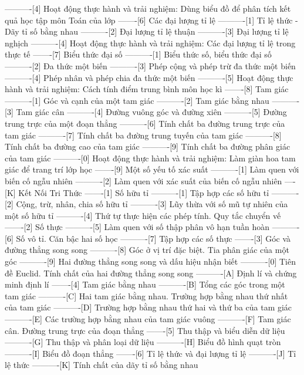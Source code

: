 ----------[4] Hoạt động thực hành và trải nghiệm: Dùng biểu đồ để phân tích kết quả học tập môn Toán của lớp
-------[6] Các đại lượng tỉ lệ
----------[1] Tỉ lệ thức - Dãy tỉ số bằng nhau
----------[2] Đại lượng tỉ lệ thuận
----------[3] Đại lượng tỉ lệ nghịch
----------[4] Hoạt động thực hành và trải nghiệm: Các đại lượng tỉ lệ trong thực tế
-------[7] Biểu thức đại số
----------[1] Biểu thức số, biểu thức đại số
----------[2] Đa thức một biến
----------[3] Phép cộng và phép trừ đa thức một biến
----------[4] Phép nhân và phép chia đa thức một biến
----------[5] Hoạt động thực hành và trải nghiệm: Cách tính điểm trung bình môn học kì
-------[8] Tam giác
----------[1] Góc và cạnh của một tam giác
----------[2] Tam giác bằng nhau
----------[3] Tam giác cân
----------[4] Đường vuông góc và đường xiên
----------[5] Đường trung trực của một đoạn thẳng
----------[6] Tính chất ba đường trung trực của tam giác
----------[7] Tính chất ba đường trung tuyến của tam giác
----------[8] Tính chất ba đường cao của tam giác
----------[9] Tính chất ba đường phân giác của tam giác
----------[0] Hoạt động thực hành và trải nghiệm: Làm giàn hoa tam giác để trang trí lớp học
-------[9] Một số yếu tố xác suất
----------[1] Làm quen với biến cố ngẫu nhiên
----------[2] Làm quen với xác suất của biến cố ngẫu nhiên
----[K] Kết Nối Tri Thức
-------[1] Số hữu tỉ
----------[1] Tập hợp các số hữu tỉ
----------[2] Cộng, trừ, nhân, chia số hữu tỉ
----------[3] Lũy thừa với số mũ tự nhiên của một số hữu tỉ
----------[4] Thứ tự thực hiện các phép tính. Quy tắc chuyển vế
-------[2] Số thực
----------[5] Làm quen với số thập phân vô hạn tuần hoàn
----------[6] Số vô tỉ. Căn bậc hai số học
----------[7] Tập hợp các số thực
-------[3] Góc và đường thẳng song song
----------[8] Góc ở vị trí đặc biệt. Tia phân giác của một góc
----------[9] Hai đường thẳng song song và dấu hiệu nhận biết
----------[0] Tiên đề Euclid. Tính chất của hai đường thẳng song song
----------[A] Định lí và chứng minh định lí
-------[4] Tam giác bằng nhau
----------[B] Tổng các góc trong một tam giác
----------[C] Hai tam giác bằng nhau. Trường hợp bằng nhau thứ nhất của tam giác
----------[D] Trường hợp bằng nhau thứ hai và thứ ba của tam giác
----------[E] Các trường hợp bằng nhau của tam giác vuông
----------[F] Tam giác cân. Đường trung trực của đoạn thẳng
-------[5] Thu thập và biểu diễn dữ liệu
----------[G] Thu thập và phân loại dữ liệu
----------[H] Biểu đồ hình quạt tròn
----------[I] Biểu đồ đoạn thẳng
-------[6] Tỉ lệ thức và đại lượng tỉ lệ
----------[J] Tỉ lệ thức
----------[K] Tính chất của dãy tỉ số bằng nhau

